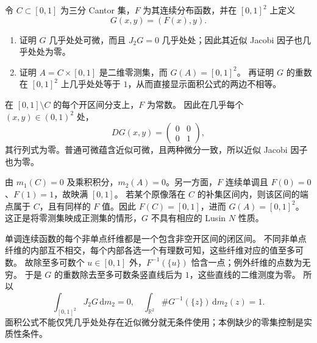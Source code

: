 \begin{optionalexercise}\label{b1:ex:17-approximate-jacobian-without-n}
令 \(C\subset[0,1]\) 为三分 Cantor 集，\(F\) 为其连续分布函数，并在 \([0,1]^2\) 上定义
\[
 G(x,y)=(F(x),y).
\]
\begin{enumerate}
\item\label{b1:item:17-cantor-jacobian}
证明 \(G\) 几乎处处可微，而且 \(J_2G=0\) 几乎处处；因此其近似 Jacobi 因子也几乎处处为零。
\item\label{b1:item:17-cantor-n-failure}
证明 \(A=C\times[0,1]\) 是二维零测集，而 \(G(A)=[0,1]^2\)。
再证明 \(G\) 的重数在 \([0,1]^2\) 上几乎处处等于 \(1\)，从而直接显示面积公式的两边不相等。
\end{enumerate}
\end{optionalexercise}
\begin{solution}
在 \([0,1]\setminus C\) 的每个开区间分支上，\(F\) 为常数。
因此在几乎每个 \((x,y)\in(0,1)^2\) 处，
\[
 DG(x,y)=\begin{pmatrix}0&0\\0&1\end{pmatrix},
\]
其行列式为零。普通可微蕴含近似可微，且两种微分一致，所以近似 Jacobi 因子也为零。

由 \(m_1(C)=0\) 及乘积积分，\(m_2(A)=0\)。另一方面，\(F\) 连续单调且 \(F(0)=0\)、\(F(1)=1\)，故映满 \([0,1]\)。
若某个原像落在 \(C\) 的补集区间内，则该区间的端点属于 \(C\)，且有同样的 \(F\) 值。因此 \(F(C)=[0,1]\)，进而 \(G(A)=[0,1]^2\)。
这正是将零测集映成正测集的情形，\(G\) 不具有相应的 Lusin \(N\) 性质。

单调连续函数的每个非单点纤维都是一个包含非空开区间的闭区间。
不同非单点纤维的内部互不相交，每个内部各选一个有理数可知，这些纤维对应的值至多可数。
故除至多可数个 \(u\in[0,1]\) 外，\(F^{-1}(\{u\})\) 恰含一点；例外纤维的点数为无穷。
于是 \(G\) 的重数除去至多可数条竖直线后为 \(1\)，这些直线的二维测度为零。
所以
\[
 \int_{[0,1]^2}J_2G\,\mathrm dm_2=0,
 \quad
 \int_{\mathbb R^2}\#G^{-1}(\{z\})\,\mathrm dm_2(z)=1.
\]
面积公式不能仅凭几乎处处存在近似微分就无条件使用；本例缺少的零集控制是实质性条件。
\end{solution}

